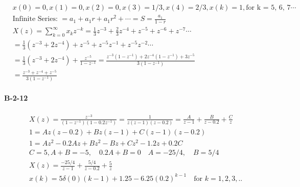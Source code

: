 {%

\begin{align*}
& x(0)=0, x(1) = 0, x(2)=0, x(3)=1/3, x(4) = 2/3, x(k) =1, \text{for k = 5, 6, 7} \cdots \\
&\text{Infinite Series: } = a_1+a_1r + a_1r^2 + \cdots = S = \frac{a_1}{1-r} \\
& X(z) = \sum_{k=0}^{\infty} x_k z^{-k} = \frac{1}{3}z^{-3}+\frac{2}{3}z^{-4}+z^{-5}+z^{-6} + z^{-7} \cdots \\ %
& = \frac{1}{3}(z^{-3}+2z^{-4})+z^{-5}+z^{-5}z^{-1} + z^{-5}z^{-2} \cdots \\
& = \frac{1}{3} (z^{-3}+2z^{-4}) + \frac{z^{-5}}{1-z^{-1}}    = \frac{z^{-3}(1-z^{-1})+2z^{-4}(1-z^{-1})+3z^{-5}}{3(1-z^{-1})} \\
& = \frac{z^{-3}+z^{-4}+z^{-5}}{3(1-z^{-1})}
\end{align*}
\paragraph{B-2-12}
%
\begin{align*}
& X(z) = \frac{z^{-3}}{(1-z^{-1})(1-0.2z^{-1})}=\frac{1}{z(z-1)(z-0.2)}=\frac{A}{z-1}+\frac{B}{z-0.2}+ \frac{C}{z}\\
& 1 =  Az(z-0.2)+Bz(z-1)+C(z-1)(z-0.2) \\
& 1 = Az^2-0.2Az+Bz^2-Bz+Cz^2-1.2z+0.2C \\
& C = 5, A+B=-5, \quad 0.2A+B=0 \quad A=-25/4, \quad B = 5/4 \\
& X(z) = \frac{-25/4}{z-1}+\frac{5/4}{z-0.2}+\frac{5}{z} \\
& x(k) = 5 \delta(0)(k-1)+1.25-6.25(0.2)^{k-1} \quad \text{for } k =1,2,3, ..
\end{align*}
}
